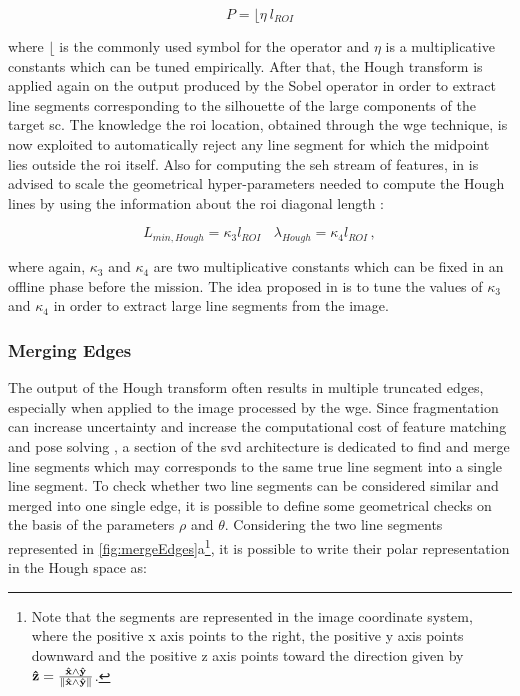 \begin{equation*}
  P = \lfloor \eta \ l_{ROI}
\end{equation*}

where $\lfloor$ is the commonly used symbol for the  operator and $\eta$ is a multiplicative constants which can be tuned empirically.
After that, the Hough transform is applied again on the output produced by the Sobel operator in order to extract line segments corresponding to the silhouette of the large components of the target \acrshort{sc}. The knowledge the \acrshort{roi} location, obtained through the \acrshort{wge} technique, is now exploited to automatically reject any line segment for which the midpoint lies outside the \acrshort{roi} itself. Also for computing the \acrfull{seh} stream of features, in \cite{Sharma2018} is advised to scale the geometrical hyper-parameters needed to compute the Hough lines by using the information about the \acrshort{roi} diagonal length :

\begin{equation*}
  L_{min,Hough} = \kappa_3 l_{ROI} \ \ \ \  \lambda_{Hough} = \kappa_4 l_{ROI}  \,,
\end{equation*}

where again, $\kappa_3$ and $\kappa_4$  are two multiplicative constants which can be fixed in an offline phase before the mission. The idea proposed in \cite{Sharma2018} is to tune the values of $\kappa_3$ and $\kappa_4$ in order to extract large line segments from the image.

\subsubsection{Merging Edges}\label{sec:mergingedges}
The output of the Hough transform often results in multiple truncated edges, especially when applied to the image processed by the \acrshort{wge}. Since fragmentation can increase uncertainty and increase the computational cost of feature matching and pose solving \cite{fracchio2019}, a section of the \acrshort{svd} architecture is dedicated to find and merge line segments which may corresponds to the same true line segment into a single line segment.
To check whether two line segments can be considered similar and merged into one single edge, it is possible to define some geometrical checks on the basis of the parameters $\rho$ and $\theta$.
Considering the two line segments represented in \ref{fig:mergeEdges}a\footnote{Note that the segments are represented in the image coordinate system, where the positive x axis points to the right, the positive y axis points downward and the positive z axis points toward the direction given by $  \mathbf{\hat{z}} = \frac{\mathbf{\hat{x}} \wedge \mathbf{\hat{y}}}{\left\lVert\mathbf{\hat{x}} \wedge \mathbf{\hat{y}}\right\rVert}$.}, it is possible to write their polar representation in the Hough space as:

